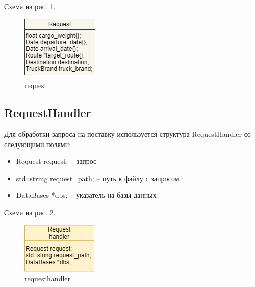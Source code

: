 Схема на рис. \ref{request}.

\begin{figure}[hpt!]
    \centering
    \includegraphics[width=0.4\linewidth]{photo/data_structures/request}
    \caption{request}
    \label{request}
\end{figure}

\subsection{RequestHandler}

Для обработки запроса на поставку используется структура RequestHandler со следующими полями: 

\begin{itemize}
    \item Request request; -- запрос
    \item std::string request\_path; -- путь к файлу с запросом
    \item DataBases *dbs; -- указатель на базы данных
\end{itemize}

Схема на рис. \ref{request_handler}.

\begin{figure}[hpt!]
    \centering
    \includegraphics[width=0.4\linewidth]{photo/data_structures/request_handler}
    \caption{requesthandler}
    \label{request_handler}
\end{figure}
